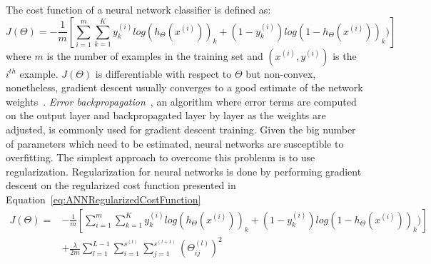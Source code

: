 The cost function of a neural network classifier is defined as:
\begin{equation}
	J(\Theta) = -\frac{1}{m} \left[\sum_{i=1}^m \sum_{k=1}^K y_k^{(i)}log(h_\Theta(x^{(i)}))_k + (1-y_k^{(i)})log(1-h_\Theta(x^{(i)}))_k)\right]
\end{equation}
where $m$ is the number of examples in the training set and $(x^{(i)},y^{(i)})$ is the $i^{th}$ example. $J(\Theta)$ is differentiable with respect to $\Theta$ but non-convex, nonetheless, gradient descent usually converges to a good estimate of the network weights~\cite{Ng2014}. \emph{Error backpropagation}~\cite{Linnainmaa1970, Werbos1974}, an algorithm where error terms are computed on the output layer and backpropagated layer by layer as the weights are adjusted, is commonly used for gradient descent training. Given the big number of parameters which need to be estimated, neural networks are susceptible to overfitting. The simplest approach to overcome this problenm is to use regularization. Regularization for neural networks is done by performing gradient descent on the regularized cost function presented in Equation~\ref{eq:ANNRegularizedCostFunction}
\begin{equation}
	\begin{split}
	J(\Theta) = &-\frac{1}{m} \left[\sum_{i=1}^m \sum_{k=1}^K y_k^{(i)}log(h_\Theta(x^{(i)}))_k + (1-y_k^{(i)})log(1-h_\Theta(x^{(i)}))_k)\right]\\ 
&+ \frac{\lambda}{2m}\sum_{l=1}^{L-1}\sum_{i=1}^{s^{(l)}}\sum_{j=1}^{s^{(l+1)}} \left(\Theta^{(l)}_{ij}\right)^2
	\end{split}
	\label{eq:ANNRegularizedCostFunction}
\end{equation}
